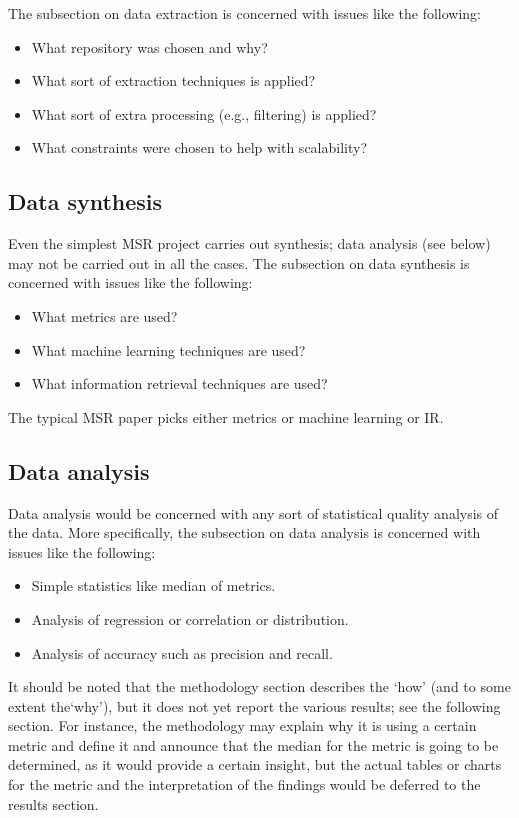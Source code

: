 The subsection on data extraction is concerned with issues like the
following:

\begin{itemize}
\item What repository was chosen and why?
\item What sort of extraction techniques is applied?
\item What sort of extra processing (e.g., filtering) is applied?
\item What constraints were chosen to help with scalability?
\end{itemize}

\subsection{Data synthesis}

Even the simplest MSR project carries out synthesis; data analysis (see
below) may not be carried out in all the cases. The subsection on data
synthesis is concerned with issues like the following:

\begin{itemize}

\item What metrics are used?

\item What machine learning techniques are used?

\item What information retrieval techniques are used?

\end{itemize}

The typical MSR paper picks either metrics or machine learning or IR.

\subsection{Data analysis}

Data analysis would be concerned with any sort of statistical quality
analysis of the data. More specifically, the subsection on data
analysis is concerned with issues like the following:

\begin{itemize}

\item Simple statistics like median of metrics.

\item Analysis of regression or correlation or distribution.

\item Analysis of accuracy such as precision and recall.

\end{itemize}

It should be noted that the methodology section describes the `how'
(and to some extent the`why'), but it does not yet report the various
results; see the following section. For instance, the methodology may
explain why it is using a certain metric and define it and announce
that the median for the metric is going to be determined, as it would
provide a certain insight, but the actual tables or charts for the
metric and the interpretation of the findings would be deferred to the
results section.
